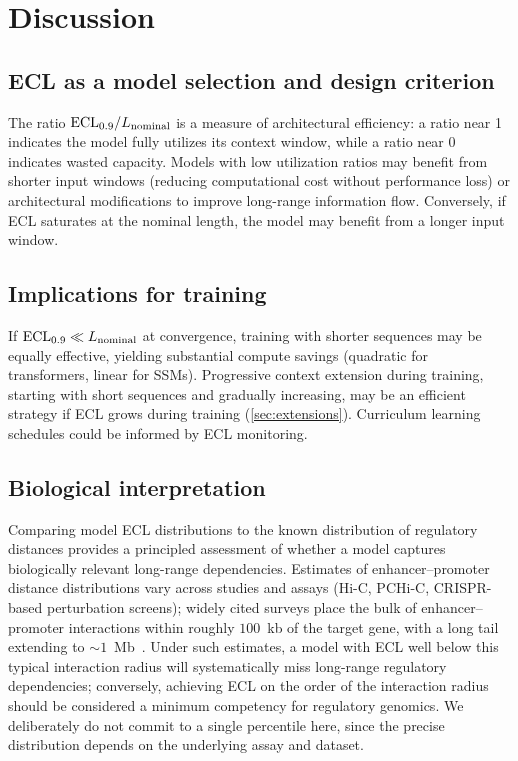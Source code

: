 \section{Discussion}\label{sec:discussion}

\subsection{ECL as a model selection and design criterion}

The ratio $\mathrm{ECL}_{0.9}/L_{\mathrm{nominal}}$ is a measure of architectural efficiency: a ratio near 1 indicates the model fully utilizes its context window, while a ratio near 0 indicates wasted capacity. Models with low utilization ratios may benefit from shorter input windows (reducing computational cost without performance loss) or architectural modifications to improve long-range information flow. Conversely, if ECL saturates at the nominal length, the model may benefit from a longer input window.

\subsection{Implications for training}

If $\mathrm{ECL}_{0.9} \ll L_{\mathrm{nominal}}$ at convergence, training with shorter sequences may be equally effective, yielding substantial compute savings (quadratic for transformers, linear for SSMs). Progressive context extension during training, starting with short sequences and gradually increasing, may be an efficient strategy if ECL grows during training (\cref{sec:extensions}). Curriculum learning schedules could be informed by ECL monitoring.

\subsection{Biological interpretation}

Comparing model ECL distributions to the known distribution of regulatory distances provides a principled assessment of whether a model captures biologically relevant long-range dependencies. Estimates of enhancer--promoter distance distributions vary across studies and assays (Hi-C, PCHi-C, CRISPR-based perturbation screens); widely cited surveys place the bulk of enhancer--promoter interactions within roughly $100$~kb of the target gene, with a long tail extending to $\sim$$1$~Mb~\citep{Karollus2023Limited}. Under such estimates, a model with ECL well below this typical interaction radius will systematically miss long-range regulatory dependencies; conversely, achieving ECL on the order of the interaction radius should be considered a minimum competency for regulatory genomics. We deliberately do not commit to a single percentile here, since the precise distribution depends on the underlying assay and dataset.

